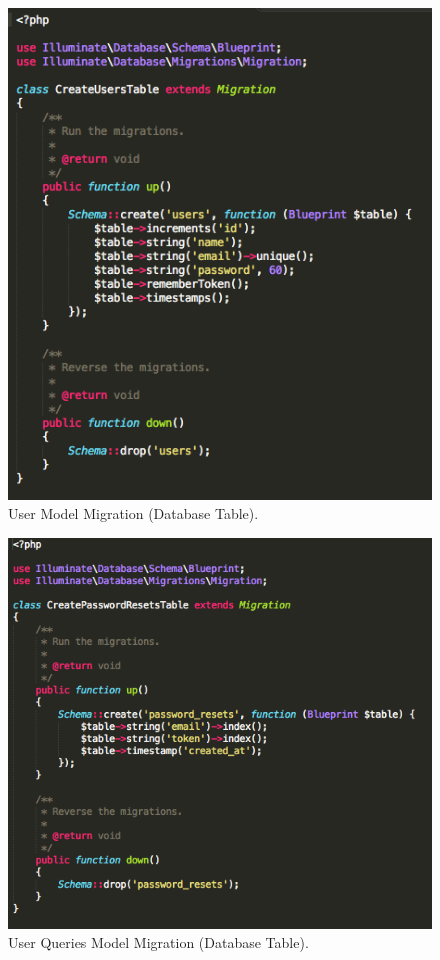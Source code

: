 \documentclass[a4paper, 11pt]{article}
\begin{document}
\begin{figure}[H]
\begin{center}
\includegraphics[scale=0.65]{userTable}
\caption{User Model Migration (Database Table).}
\label{usertable}
\end{center}
\end{figure}

\begin{figure}[H]
\begin{center}
\includegraphics[scale=0.65]{passwordTable}
\caption{User Queries Model Migration (Database Table).}
\label{passwordtable}
\end{center}
\end{figure}
\end{document}
